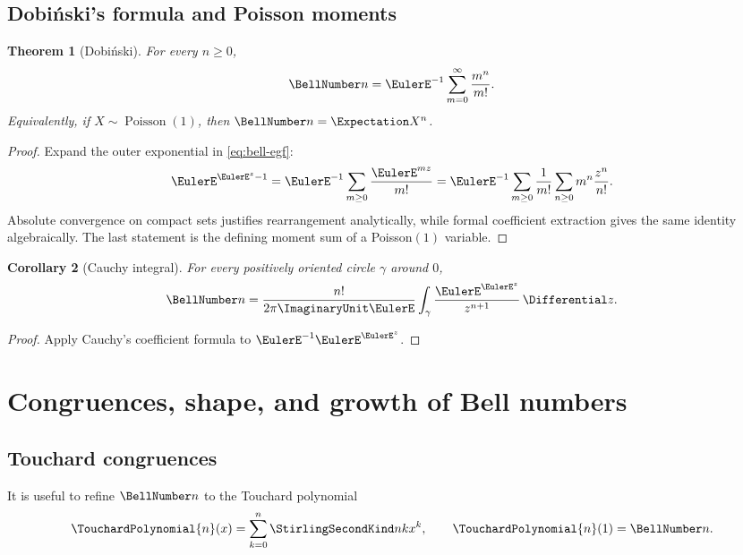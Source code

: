 \documentclass[11pt,a4paper,oneside,openany]{book}
\newtheorem{theorem}{Theorem}[chapter]
\newtheorem{corollary}[theorem]{Corollary}
\theoremstyle{definition}
\theoremstyle{remark}
\begin{document}
\section{Dobiński's formula and Poisson moments}
\begin{theorem}[Dobiński]\label{thm:dobinski}
For every $n\ge0$,
\begin{equation}\label{eq:dobinski}
 \BellNumber n=\EulerE^{-1}\sum_{m=0}^{\infty}\frac{m^n}{m!}.
\end{equation}
Equivalently, if $X\sim\operatorname{Poisson}(1)$, then $\BellNumber n=\Expectation X^n$.
\end{theorem}
\begin{proof}
Expand the outer exponential in \eqref{eq:bell-egf}:
\[
 \EulerE^{\EulerE^z-1}=\EulerE^{-1}\sum_{m\ge0}\frac{\EulerE^{mz}}{m!}
 =\EulerE^{-1}\sum_{m\ge0}\frac1{m!}\sum_{n\ge0}m^n\frac{z^n}{n!}.
\]
Absolute convergence on compact sets justifies rearrangement analytically, while
formal coefficient extraction gives the same identity algebraically.  The last
statement is the defining moment sum of a Poisson$(1)$ variable.
\end{proof}

\begin{corollary}[Cauchy integral]
For every positively oriented circle $\gamma$ around $0$,
\begin{equation}\label{eq:bell-cauchy}
 \BellNumber n=\frac{n!}{2\pi \ImaginaryUnit \EulerE}\int_\gamma
       \frac{\EulerE^{\EulerE^z}}{z^{n+1}}\,\Differential z.
\end{equation}
\end{corollary}
\begin{proof}
Apply Cauchy's coefficient formula to $\EulerE^{-1}\EulerE^{\EulerE^z}$.
\end{proof}

\chapter{Congruences, shape, and growth of Bell numbers}

\section{Touchard congruences}
It is useful to refine $\BellNumber n$ to the Touchard polynomial
\[
 \TouchardPolynomial{n}(x)=\sum_{k=0}^{n}\StirlingSecondKind nk x^k,
 \qquad \TouchardPolynomial{n}(1)=\BellNumber n.
\]
\end{document}
